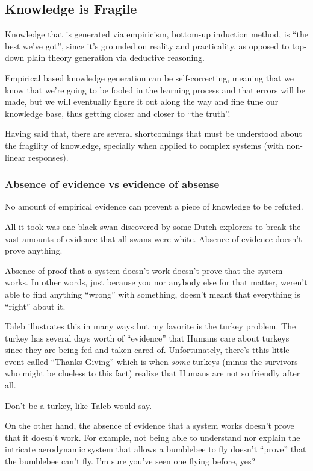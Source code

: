 \documentclass{article}
\begin{document}
\subsection{Knowledge is Fragile}

Knowledge that is generated via empiricism, bottom-up induction method, is ``the best we've got'', since it's grounded on reality and practicality, as opposed to top-down plain theory generation via deductive reasoning.

Empirical based knowledge generation can be self-correcting, meaning that we know that we're going to be fooled in the learning process and that errors will be made, but we will eventually figure it out along the way and fine tune our knowledge base, thus getting closer and closer to ``the truth''.

Having said that, there are several shortcomings that must be understood about the fragility of knowledge, specially when applied to complex systems (with non-linear responses).

\subsubsection{Absence of evidence vs evidence of absense}

No amount of empirical evidence can prevent a piece of knowledge to be refuted.

All it took was one black swan discovered by some Dutch explorers to break the vast amounts of evidence that all swans were white. Absence of evidence doesn't prove anything.

Absence of proof that a system doesn't work doesn't prove that the system works. 
In other words, just because you nor anybody else for that matter, weren't able to find anything ``wrong'' with something, doesn't meant that everything is ``right'' about it.

Taleb illustrates this in many ways but my favorite is the turkey problem. The turkey has several days worth of ``evidence'' that Humans care about turkeys since they are being fed and taken cared of. Unfortunately, there's tthis little event called ``Thanks Giving'' which is when \textit{some} turkeys (minus the survivors who might be clueless to this fact) realize that Humans are not so friendly after all. 

Don't be a turkey, like Taleb would say.

On the other hand, the absence of evidence that a system works doesn't prove that it doesn't work. For example, not being able to understand nor explain the intricate aerodynamic system that allows a bumblebee to fly doesn't ``prove'' that the bumblebee can't fly. I'm sure you've seen one flying before, yes?
\end{document}
